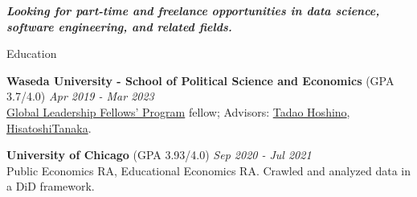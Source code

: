\documentclass{resume} %
\begin{document}
{\centerline {\em \textbf { Looking for part-time and freelance opportunities in data science, software engineering, and related fields. } } }

\begin{rSection}{Education}

{\bf Waseda University - School of Political Science and Economics }(GPA 3.7/4.0) \hfill {\em Apr 2019 - Mar 2023} 
\\\href{http://www2.cie-waseda.jp/glfp/jp/about/program.html}{Global Leadership Fellows' Program} fellow; Advisors: \href{https://tadaohoshino.wordpress.com/}{Tadao Hoshino}, \href{https://waseda.pure.elsevier.com/en/persons/hisatoshi-tanaka}{HisatoshiTanaka}.

{\bf University of Chicago }(GPA 3.93/4.0) \hfill {\em Sep 2020 - Jul 2021} 
\\Public Economics RA, Educational Economics RA. Crawled and analyzed data in a DiD framework. 

%


\end{rSection}
\end{document}
